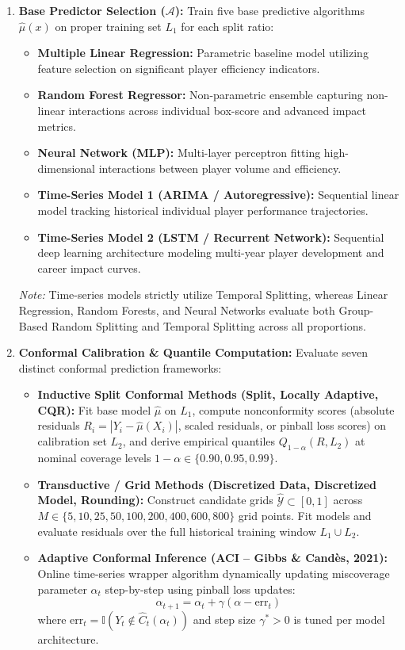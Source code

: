 \documentclass[11pt,a4paper]{article}
\begin{document}
\begin{enumerate}
    \item \textbf{Base Predictor Selection ($\mathcal{A}$):}
    Train five base predictive algorithms $\hat{\mu}(x)$ on proper training set $L_1$ for each split ratio:
    \begin{itemize}
        \item \textbf{Multiple Linear Regression:} Parametric baseline model utilizing feature selection on significant player efficiency indicators.
        \item \textbf{Random Forest Regressor:} Non-parametric ensemble capturing non-linear interactions across individual box-score and advanced impact metrics.
        \item \textbf{Neural Network (MLP):} Multi-layer perceptron fitting high-dimensional interactions between player volume and efficiency.
        \item \textbf{Time-Series Model 1 (ARIMA / Autoregressive):} Sequential linear model tracking historical individual player performance trajectories.
        \item \textbf{Time-Series Model 2 (LSTM / Recurrent Network):} Sequential deep learning architecture modeling multi-year player development and career impact curves.
    \end{itemize}
    \textit{Note:} Time-series models strictly utilize Temporal Splitting, whereas Linear Regression, Random Forests, and Neural Networks evaluate both Group-Based Random Splitting and Temporal Splitting across all proportions.

    \item \textbf{Conformal Calibration \& Quantile Computation:}
    Evaluate seven distinct conformal prediction frameworks:
    \begin{itemize}
        \item \textbf{Inductive Split Conformal Methods (Split, Locally Adaptive, CQR):} Fit base model $\hat{\mu}$ on $L_1$, compute nonconformity scores (absolute residuals $R_i = |Y_i - \hat{\mu}(X_i)|$, scaled residuals, or pinball loss scores) on calibration set $L_2$, and derive empirical quantiles $Q_{1-\alpha}(R, L_2)$ at nominal coverage levels $1-\alpha \in \{0.90, 0.95, 0.99\}$.
        \item \textbf{Transductive / Grid Methods (Discretized Data, Discretized Model, Rounding):} Construct candidate grids $\hat{\mathcal{Y}} \subset [0, 1]$ across $M \in \{5, 10, 25, 50, 100, 200, 400, 600, 800\}$ grid points. Fit models and evaluate residuals over the full historical training window $L_1 \cup L_2$.
        \item \textbf{Adaptive Conformal Inference (ACI -- Gibbs \& Cand\`{e}s, 2021):} Online time-series wrapper algorithm dynamically updating miscoverage parameter $\alpha_t$ step-by-step using pinball loss updates:
        \[ \alpha_{t+1} = \alpha_t + \gamma(\alpha - \text{err}_t) \]
        where $\text{err}_t = \mathbb{I}(Y_t \notin \hat{C}_t(\alpha_t))$ and step size $\gamma^* > 0$ is tuned per model architecture.
    \end{itemize}


\end{enumerate}
\end{document}
